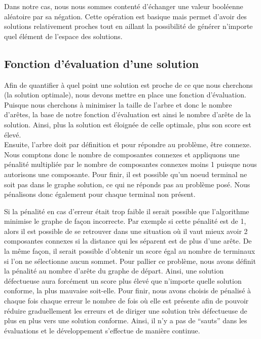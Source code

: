 \documentclass{article}
\begin{document}
Dans notre cas, nous nous sommes contenté d'échanger une valeur booléenne aléatoire par sa négation. Cette opération est basique mais permet d'avoir des solutions relativement proches tout en aillant la possibilité de générer n'importe quel élément de l'espace des solutions.

\subsection{Fonction d'évaluation d'une solution}
Afin de quantifier à quel point une solution est proche de ce que nous cherchons (la solution optimale), nous devons mettre en place une fonction d'évaluation. Puisque nous cherchons à minimiser la taille de l'arbre et donc le nombre d'arêtes, la base de notre fonction d'évaluation est ainsi le nombre d'arête de la solution. Ainsi, plus la solution est éloignée de celle optimale, plus son score est élevé. \\
Ensuite, l'arbre doit par définition et pour répondre au problème, être connexe. Nous comptons donc le nombre de composantes connexes et appliquons une pénalité multipliée par le nombre de composantes connexes moins 1 puisque nous autorisons une composante. Pour finir, il est possible qu'un noeud terminal ne soit pas dans le graphe solution, ce qui ne réponds pas au problème posé. Nous pénalisons donc également pour chaque terminal non présent. \\ \par

Si la pénalité en cas d'erreur était trop faible il serait possible que l'algorithme minimise le graphe de façon incorrecte. Par exemple si cette pénalité est de 1, alors il est possible de se retrouver dans une situation où il vaut mieux avoir 2 composantes connexes si la distance qui les séparent est de plus d'une arête. De la même façon, il serait possible d'obtenir un score égal au nombre de terminaux si l'on ne sélectionne aucun sommet. Pour pallier ce problème, nous avons définit la pénalité au nombre d'arête du graphe de départ. Ainsi, une solution défectueuse aura forcément un score plus élevé que n'importe quelle solution conforme, la plus mauvaise soit-elle. Pour finir, nous avons choisis de pénalisé à chaque fois chaque erreur le nombre de fois où elle est présente afin de pouvoir réduire graduellement les erreurs et de diriger une solution très défectueuse de plus en plus vers une solution conforme. Ainsi, il n'y a pas de ``sauts'' dans les évaluations et le développement s'effectue de manière continue.
\end{document}
